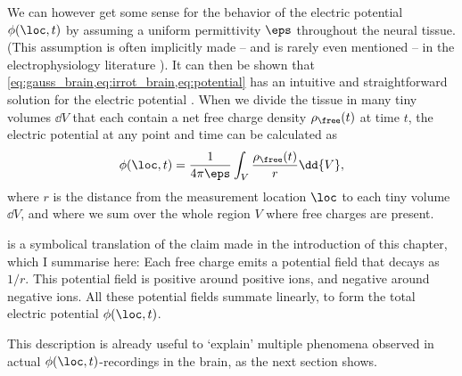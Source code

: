 We can however get some sense for the behavior of the electric potential $\phi(\loc,t)$ by assuming a uniform permittivity $\eps$ throughout the neural tissue. (This assumption is often implicitly made -- and is rarely even mentioned -- in the electrophysiology literature \cite{Plonsey2007,Nunez2006,Destexhe2013}). It can then be shown that \cref{eq:gauss_brain,eq:irrot_brain,eq:potential} has an intuitive and straightforward solution for the electric potential \cite{Feynman2013}. When we divide the tissue in many tiny volumes $\dd{V}$ that each contain a net free charge density $\rho_\free(t)$ at time $t$, the electric potential at any point and time can be calculated as
%
\begin{equation}
\label{eq:charge_sum}
\phi(\loc,t) = \frac{1}{4 \pi \eps} \int_V \frac{\rho_\free(t)}{r} \dd{V},
\end{equation}
% 
where $r$ is the distance from the measurement location $\loc$ to each tiny volume $\dd{V}$, and where we sum over the whole region $V$ where free charges are present.

 is a symbolical translation of the claim made in the introduction of this chapter, which I summarise here: Each free charge emits a potential field that decays as $1/r$. This potential field is positive around positive ions, and negative around negative ions. All these potential fields summate linearly, to form the total electric potential $\phi(\loc,t)$.

This description is already useful to `explain' multiple phenomena observed in actual $\phi(\loc,t)$-recordings in the brain, as the next section shows.
